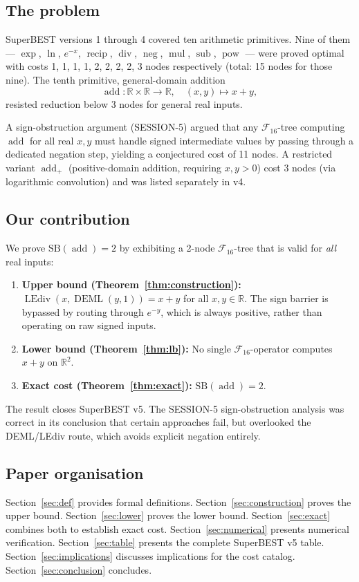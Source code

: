 \documentclass[12pt,a4paper]{article}
\theoremstyle{definition}
\newcommand{\DEML}{\operatorname{DEML}}
\newcommand{\LEdiv}{\operatorname{LEdiv}}
\newcommand{\recip}{\operatorname{recip}}
\newcommand{\divop}{\operatorname{div}}
\newcommand{\mulop}{\operatorname{mul}}
\newcommand{\subop}{\operatorname{sub}}
\newcommand{\addop}{\operatorname{add}}
\newcommand{\negop}{\operatorname{neg}}
\newcommand{\powop}{\operatorname{pow}}
\newcommand{\SB}{\mathrm{SB}}
\newcommand{\F}{\mathcal{F}_{16}}
\newcommand{\R}{\mathbb{R}}
\begin{document}
\subsection{The problem}

SuperBEST versions 1 through 4 covered ten arithmetic primitives.
Nine of them --- $\exp$, $\ln$, $e^{-x}$, $\recip$, $\divop$, $\negop$,
$\mulop$, $\subop$, $\powop$ --- were proved optimal with costs 1, 1, 1, 1,
2, 2, 2, 2, 3 nodes respectively (total: 15 nodes for those nine).
The tenth primitive, general-domain addition
\[
  \addop \colon \R \times \R \to \R, \quad (x,y) \mapsto x+y,
\]
resisted reduction below 3 nodes for general real inputs.

A sign-obstruction argument (SESSION-5) argued that any $\F$-tree computing
$\addop$ for all real $x, y$ must handle signed intermediate values by passing
through a dedicated negation step, yielding a conjectured cost of 11 nodes.
A restricted variant $\addop_+$ (positive-domain addition, requiring $x,y>0$)
cost 3 nodes (via logarithmic convolution) and was listed separately in v4.

\subsection{Our contribution}

We prove $\SB(\addop) = 2$ by exhibiting a 2-node $\F$-tree that is valid
for \emph{all} real inputs:
\begin{enumerate}
\item \textbf{Upper bound (Theorem~\ref{thm:construction}):}
  $\LEdiv(x, \DEML(y,1)) = x + y$ for all $x, y \in \R$.
  The sign barrier is bypassed by routing through $e^{-y}$, which is always
  positive, rather than operating on raw signed inputs.
\item \textbf{Lower bound (Theorem~\ref{thm:lb}):}
  No single $\F$-operator computes $x+y$ on $\R^2$.
\item \textbf{Exact cost (Theorem~\ref{thm:exact}):} $\SB(\addop) = 2$.
\end{enumerate}

The result closes SuperBEST v5.
The SESSION-5 sign-obstruction analysis was correct in its conclusion that
certain approaches fail, but overlooked the DEML/LEdiv route, which avoids
explicit negation entirely.

\subsection{Paper organisation}
Section~\ref{sec:def} provides formal definitions.
Section~\ref{sec:construction} proves the upper bound.
Section~\ref{sec:lower} proves the lower bound.
Section~\ref{sec:exact} combines both to establish exact cost.
Section~\ref{sec:numerical} presents numerical verification.
Section~\ref{sec:table} presents the complete SuperBEST v5 table.
Section~\ref{sec:implications} discusses implications for the cost catalog.
Section~\ref{sec:conclusion} concludes.
\end{document}
